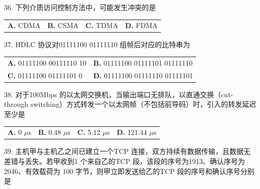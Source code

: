 \documentclass[UTF8,11pt]{ctexart}
\begin{document}
36. 下列介质访问控制方法中，可能发生冲突的是


\begin{center}\begin{tabular}{>{\raggedright\arraybackslash}p{\dimexpr(\linewidth-8\tabcolsep)/4\relax}>{\raggedright\arraybackslash}p{\dimexpr(\linewidth-8\tabcolsep)/4\relax}>{\raggedright\arraybackslash}p{\dimexpr(\linewidth-8\tabcolsep)/4\relax}>{\raggedright\arraybackslash}p{\dimexpr(\linewidth-8\tabcolsep)/4\relax}}
\textbf{A.} CDMA & \textbf{B.} CSMA & \textbf{C.} TDMA & \textbf{D.} FDMA\\[.35em]\end{tabular}\end{center}

37. HDLC 协议对01111100 01111110 组帧后对应的比特串为


\begin{center}\begin{tabular}{>{\raggedright\arraybackslash}p{\dimexpr(\linewidth-4\tabcolsep)/2\relax}>{\raggedright\arraybackslash}p{\dimexpr(\linewidth-4\tabcolsep)/2\relax}}
\textbf{A.} 01111100 00111110 10 & \textbf{B.} 01111100 01111101 01111110\\[.35em]
\textbf{C.} 01111100 01111101 0 & \textbf{D.} 01111100 01111110 01111101\\[.35em]\end{tabular}\end{center}

38. 对于100Mbps 的以太网交换机，当输出端口无排队，以直通交换（cut-through switching）方式转发一个以太网帧（不包括前导码）时，引入的转发延迟至少是


\begin{center}\begin{tabular}{>{\raggedright\arraybackslash}p{\dimexpr(\linewidth-8\tabcolsep)/4\relax}>{\raggedright\arraybackslash}p{\dimexpr(\linewidth-8\tabcolsep)/4\relax}>{\raggedright\arraybackslash}p{\dimexpr(\linewidth-8\tabcolsep)/4\relax}>{\raggedright\arraybackslash}p{\dimexpr(\linewidth-8\tabcolsep)/4\relax}}
\textbf{A.} 0 \(\displaystyle \mu\mathrm{s}\) & \textbf{B.} 0.\allowbreak{}48 \(\displaystyle \mu\mathrm{s}\) & \textbf{C.} 5.\allowbreak{}12 \(\displaystyle \mu\mathrm{s}\) & \textbf{D.} 121.\allowbreak{}44 \(\displaystyle \mu\mathrm{s}\)\\[.35em]\end{tabular}\end{center}

39. 主机甲与主机乙之间已建立一个TCP 连接，双方持续有数据传输，且数据无差错与丢失。若甲收到1 个来自乙的TCP 段，该段的序号为1913、确认序号为2046、有效载荷为 100 字节，则甲立即发送给乙的TCP 段的序号和确认序号分别是
\end{document}
